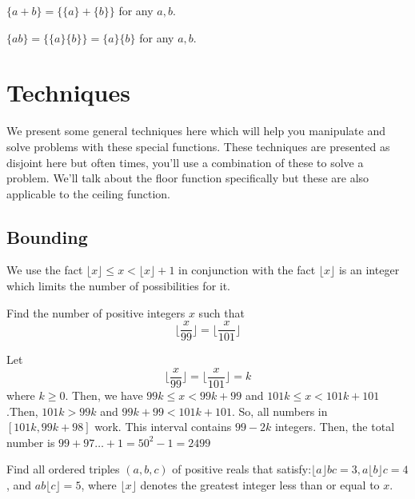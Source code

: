 \documentclass{article}
\begin{document}
\begin{theo}
$\{a+b\}=\{\{a\}+\{b\}\}$ for any $a,b$.
\end{theo}

\begin{theo}
$\{ab\}=\{\{a\}\{b\}\}=\{a\}\{b\}$ for any $a,b$.
\end{theo}

\newpage
\section{Techniques}
We present some general techniques here which will help you manipulate and solve problems with these special functions. These techniques are presented as disjoint here but often times, you'll use a combination of these to solve a problem. We'll talk about the floor function specifically but these are also applicable to the ceiling function.

\subsection{Bounding}
We use the fact $\lfloor x \rfloor \leq x < \lfloor x \rfloor + 1$ in conjunction with the fact $\lfloor x \rfloor$ is an integer which limits the number of possibilities for it.


\begin{exam}[RMO 2001/3]
Find the number of positive integers $x$ such that
$$\lfloor \frac{x}{99} \rfloor = \lfloor \frac{x}{101} \rfloor $$
\end{exam}

\begin{sol}
Let $$\lfloor \frac{x}{99} \rfloor = \lfloor \frac{x}{101} \rfloor = k$$ where $k\ge 0$.
Then, we have $99k\leq x < 99k+99$ and $101k\leq x < 101k+101$.Then, $101k > 99k$ and $99k+99 < 101k+101$. So, all numbers in $[101k,99k+98]$ work. This interval contains $99-2k$ integers. Then, the total number is $99+97\ldots + 1 = 50^2-1=\boxed{2499}$
\end{sol}

\begin{exam}
Find all ordered triples $(a, b, c)$ of positive reals that satisfy:$\lfloor a\rfloor bc = 3, a\lfloor b\rfloor c = 4$, and $ab\lfloor c\rfloor =5$, where
$\lfloor x\rfloor$ denotes the greatest integer less than or equal to $x$.
\end{exam}
\end{document}
